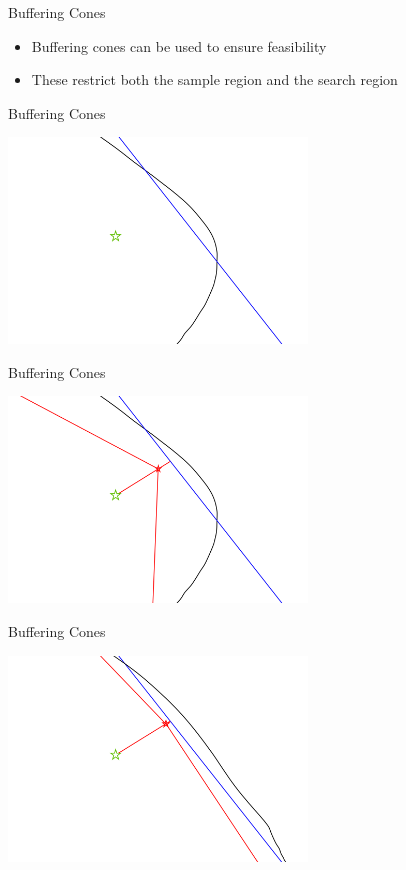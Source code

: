 \documentclass{beamer}
\begin{document}
\begin{frame}{Buffering Cones}
	\begin{itemize}
		\item Buffering cones can be used to ensure feasibility
		\item These restrict both the sample region and the search region
	\end{itemize}
\end{frame}

\begin{frame}{Buffering Cones}
	\begin{center}
		\includegraphics[width=300px]{images/explanation_1.png}
	\end{center}
\end{frame}


\begin{frame}{Buffering Cones}
	\begin{center}
		\includegraphics[width=300px]{images/explanation_2.png}
	\end{center}
\end{frame}


\begin{frame}{Buffering Cones}
	\begin{center}
		\includegraphics[width=300px]{images/explanation_3.png}
	\end{center}
\end{frame}
\end{document}
